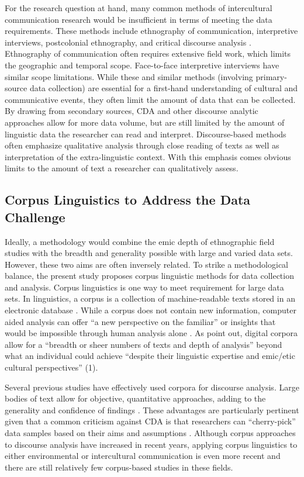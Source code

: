 For the research question at hand, many common methods of intercultural communication research would be insufficient in terms of meeting the data requirements. These methods include ethnography of communication, interpretive interviews, postcolonial ethnography, and critical discourse analysis \citep{Oetzel2016a}. Ethnography of communication often requires extensive field work, which limits the geographic and temporal scope. Face-to-face interpretive interviews have similar scope limitations. While these and similar methods (involving primary-source data collection) are essential for a first-hand understanding of cultural and communicative events, they often limit the amount of data that can be collected. By drawing from secondary sources, CDA and other discourse analytic approaches allow for more data volume, but are still limited by the amount of linguistic data the researcher can read and interpret. Discourse-based methods often emphasize qualitative analysis through close reading of texts as well as interpretation of the extra-linguistic context. With this emphasis comes obvious limits to the amount of text a researcher can qualitatively assess. 

\subsection{Corpus Linguistics to Address the Data Challenge}

Ideally, a methodology would combine the emic depth of ethnographic field studies with the breadth and generality possible with large and varied data sets. However, these two aims are often inversely related. To strike a methodological balance, the present study proposes corpus linguistic methods for data collection and analysis. Corpus linguistics is one way to meet requirement for large data sets. In linguistics, a corpus is a collection of machine-readable texts stored in an electronic database \citep[48]{Baker2006c}. While a corpus does not contain new information, computer aided analysis can offer ``a new perspective on the familiar'' or insights that would be impossible through human analysis alone \citep[2-3]{Hunston2002a}. As \cite*{Belcher2013a} point out, digital corpora allow for a ``breadth or sheer numbers of texts and depth of analysis'' beyond what an individual could achieve ``despite their linguistic expertise and emic/etic cultural perspectives'' (1).

Several previous studies have effectively used corpora for discourse analysis. Large bodies of text allow for objective, quantitative approaches, adding to the generality and confidence of findings \citep[e.g.,][297]{Gabrielatos2008a}. These advantages are particularly pertinent given that a common criticism against CDA is that researchers can ``cherry-pick'' data samples based on their aims and assumptions \citep{Mautner2009a}. Although corpus approaches to discourse analysis have increased in recent years, applying corpus linguistics to either environmental or intercultural communication is even more recent and there are still relatively few corpus-based studies in these fields. 	

